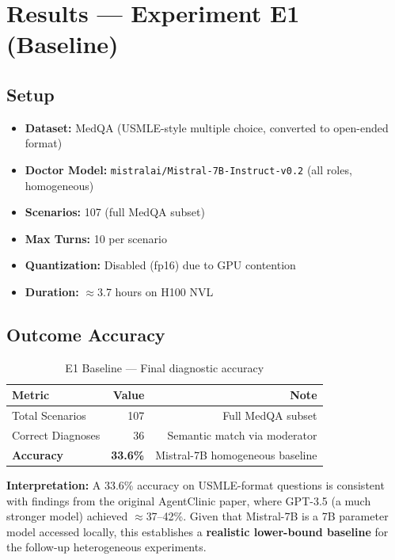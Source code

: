 \documentclass[12pt, a4paper]{article}
\begin{document}
\section{Results — Experiment E1 (Baseline)}

\subsection{Setup}
\begin{itemize}
    \item \textbf{Dataset:} MedQA (USMLE-style multiple choice, converted to open-ended format)
    \item \textbf{Doctor Model:} \texttt{mistralai/Mistral-7B-Instruct-v0.2} (all roles, homogeneous)
    \item \textbf{Scenarios:} 107 (full MedQA subset)
    \item \textbf{Max Turns:} 10 per scenario
    \item \textbf{Quantization:} Disabled (fp16) due to GPU contention
    \item \textbf{Duration:} $\approx$3.7 hours on H100 NVL
\end{itemize}

\subsection{Outcome Accuracy}

\begin{table}[H]
\centering
\caption{E1 Baseline — Final diagnostic accuracy}
\begin{tabular}{@{}lrr@{}}
\toprule
\textbf{Metric}          & \textbf{Value} & \textbf{Note} \\
\midrule
Total Scenarios          & 107   & Full MedQA subset \\
Correct Diagnoses        & 36    & Semantic match via moderator \\
\textbf{Accuracy}        & \textbf{33.6\%} & Mistral-7B homogeneous baseline \\
\bottomrule
\end{tabular}
\end{table}

\noindent\textbf{Interpretation:} A 33.6\% accuracy on USMLE-format questions is consistent with findings from the original AgentClinic paper, where GPT-3.5 (a much stronger model) achieved $\approx$37--42\%. Given that Mistral-7B is a 7B parameter model accessed locally, this establishes a \textbf{realistic lower-bound baseline} for the follow-up heterogeneous experiments.
\end{document}
